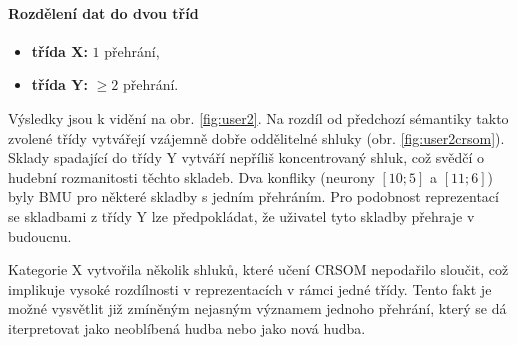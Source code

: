 \documentclass[thesis=M,czech]{FITthesis}[2012/06/26]
\begin{document}
\paragraph{Rozdělení dat do dvou tříd}
\begin{itemize}
\item \textbf{třída X:} $1$ přehrání,
\item \textbf{třída Y:} $\geq2$ přehrání.
\end{itemize}

Výsledky jsou k vidění na obr. \ref{fig:user2}. Na rozdíl od předchozí sémantiky takto zvolené třídy vytvářejí vzájemně dobře oddělitelné shluky (obr. \ref{fig:user2crsom}). Sklady spadající do třídy Y vytváří nepříliš koncentrovaný shluk, což svědčí o hudební rozmanitosti těchto skladeb. Dva konfliky (neurony $[10;5]$ a $[11;6]$) byly BMU pro některé skladby s jedním přehráním. Pro podobnost reprezentací se skladbami z třídy Y lze předpokládat, že uživatel tyto skladby přehraje v budoucnu.

Kategorie X vytvořila několik shluků, které učení CRSOM nepodařilo sloučit, což implikuje vysoké rozdílnosti v reprezentacích v rámci jedné třídy. Tento fakt je možné vysvětlit již zmíněným nejasným významem jednoho přehrání, který se dá iterpretovat jako neoblíbená hudba nebo jako nová hudba.  
\end{document}
